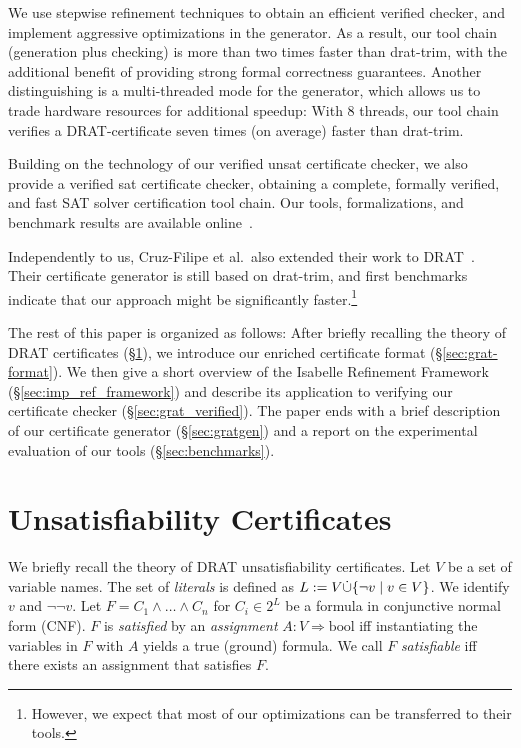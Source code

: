 \documentclass{llncs}
\begin{document}
We use stepwise refinement techniques to obtain an efficient verified checker, and implement aggressive optimizations in the generator.
As a result, our tool chain (generation plus checking) is more than two times faster than drat-trim, with the additional benefit 
of providing strong formal correctness guarantees.
Another distinguishing is a multi-threaded mode for the generator, which allows us to trade hardware resources for additional speedup:
With 8 threads, our tool chain verifies a DRAT-certificate seven times (on average) faster than drat-trim.

Building on the technology of our verified unsat certificate checker, we also provide a verified sat certificate checker, 
obtaining a complete, formally verified, and fast SAT solver certification tool chain. 
Our tools, formalizations, and benchmark results are available online~\cite{GRAT-homepage}.

Independently to us, Cruz-Filipe et al.\ also extended their work to DRAT~\cite{CHHKS17}. 
Their certificate generator is still based on drat-trim, and first benchmarks indicate that
our approach might be significantly faster.\footnote{However, we expect that most of our optimizations can be transferred to their tools.}


The rest of this paper is organized as follows: 
After briefly recalling the theory of DRAT certificates (\S\ref{sec:unsat_cert}), we introduce our enriched certificate format (\S\ref{sec:grat-format}).
We then give a short overview of the Isabelle Refinement Framework (\S\ref{sec:imp_ref_framework})
and describe its application to verifying our certificate checker (\S\ref{sec:grat_verified}). 
The paper ends with a brief description of our certificate generator (\S\ref{sec:gratgen}) and a report on the experimental evaluation 
of our tools (\S\ref{sec:benchmarks}).

\section{Unsatisfiability Certificates}\label{sec:unsat_cert}
We briefly recall the theory of DRAT unsatisfiability certificates. 
Let $V$ be a set of variable names. The set of \emph{literals} is defined as $L := V \dot{\cup} \{\neg v \mid v\in V \}$.
We identify $v$ and $\neg\neg v$.
Let $F = C_1 \wedge \ldots \wedge C_n$ for $C_i \in 2^L$ be a formula in conjunctive normal form (CNF). 
$F$ is \emph{satisfied} by an \emph{assignment} $A : V \Rightarrow \textrm{bool}$ iff instantiating the variables in $F$ with $A$ yields a true (ground) formula.
We call $F$ \emph{satisfiable} iff there exists an assignment that satisfies $F$.
\end{document}

